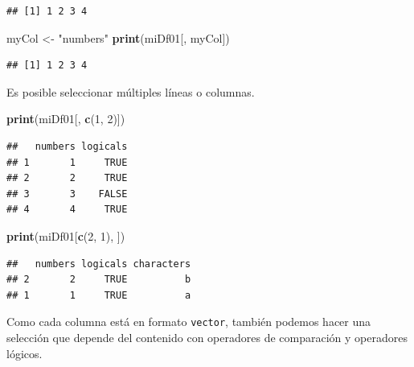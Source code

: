 \documentclass[
]{book}
\newenvironment{Shaded}{\begin{snugshade}}{\end{snugshade}}
\newcommand{\DecValTok}[1]{\textcolor[rgb]{0.00,0.00,0.81}{#1}}
\newcommand{\KeywordTok}[1]{\textcolor[rgb]{0.13,0.29,0.53}{\textbf{#1}}}
\newcommand{\NormalTok}[1]{#1}
\newcommand{\OperatorTok}[1]{\textcolor[rgb]{0.81,0.36,0.00}{\textbf{#1}}}
\newcommand{\StringTok}[1]{\textcolor[rgb]{0.31,0.60,0.02}{#1}}
\begin{document}
\begin{verbatim}
## [1] 1 2 3 4
\end{verbatim}

\begin{Shaded}
\begin{Highlighting}[]
\NormalTok{myCol <-}\StringTok{ "numbers"}
\KeywordTok{print}\NormalTok{(miDf01[, myCol])}
\end{Highlighting}
\end{Shaded}

\begin{verbatim}
## [1] 1 2 3 4
\end{verbatim}

Es posible seleccionar múltiples líneas o columnas.

\begin{Shaded}
\begin{Highlighting}[]
\KeywordTok{print}\NormalTok{(miDf01[, }\KeywordTok{c}\NormalTok{(}\DecValTok{1}\NormalTok{, }\DecValTok{2}\NormalTok{)])}
\end{Highlighting}
\end{Shaded}

\begin{verbatim}
##   numbers logicals
## 1       1     TRUE
## 2       2     TRUE
## 3       3    FALSE
## 4       4     TRUE
\end{verbatim}

\begin{Shaded}
\begin{Highlighting}[]
\KeywordTok{print}\NormalTok{(miDf01[}\KeywordTok{c}\NormalTok{(}\DecValTok{2}\NormalTok{, }\DecValTok{1}\NormalTok{), ])}
\end{Highlighting}
\end{Shaded}

\begin{verbatim}
##   numbers logicals characters
## 2       2     TRUE          b
## 1       1     TRUE          a
\end{verbatim}

Como cada columna está en formato \texttt{vector}, también podemos hacer una selección que depende del contenido con operadores de comparación y operadores lógicos.

\begin{Shaded}
\end{Shaded}
\end{document}
